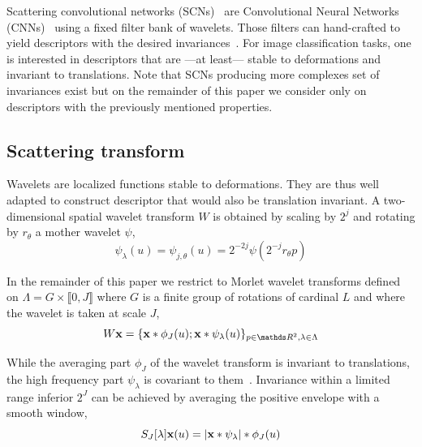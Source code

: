 \documentclass{article}
\begin{document}
		Scattering convolutional networks (SCNs)~\cite{bruna} are Convolutional Neural Networks (CNNs)~\citet{lecun1995convolutional} using a fixed filter bank of wavelets. Those filters can hand-crafted to yield descriptors with the desired invariances~\cite{work translation invariant, work rotation invariant, work rigid motion}. For image classification tasks, one is interested in descriptors that are ---at least--- stable to deformations and invariant to translations. Note that SCNs producing more complexes set of invariances exist but on the remainder of this paper we consider only on descriptors with the previously mentioned properties.
  
  \subsection{Scattering transform}
    \label{subsec:SCN/ST}
    
    Wavelets are localized functions stable to deformations. They are thus well adapted to construct descriptor that would also be translation invariant. A two-dimensional spatial wavelet transform $W$ is obtained by scaling by $2^{j}$ and rotating by $r_{\theta}$ a mother wavelet $\psi$,
    \vspace{-5pt}
    \begin{equation}
      \label{eq:multi-scale directional wavelet}
      \psi_{\lambda}(u) = \psi_{j,\theta}(u) = 2^{-2j} \psi(2^{-j}r_{\theta}p)
    \end{equation}
    
    In the remainder of this paper we restrict to Morlet wavelet transforms defined on $\Lambda = G \times \llbracket 0,J \rrbracket$ where $G$ is a finite group of rotations of cardinal $L$ and where the wavelet is taken at scale $J$,
    \vspace{-5pt}
    \begin{equation}
      \label{eq:wavelet transform}
      W\bfx = \{ \bfx \ast \phi_{J}(u); \bfx \ast \psi_{\lambda}(u) \}_{p\in\dsR^{2},\lambda \in \Lambda}
    \end{equation}
    \vspace{-15pt}

    While the averaging part $\phi_{J}$ of the wavelet transform is invariant to translations, the high frequency part $\psi_{\lambda}$ is covariant to them~\cite{mallat}. Invariance within a limited range inferior $2^{J}$ can be achieved by averaging the positive envelope with a smooth window,
    \vspace{-5pt}
    \begin{equation}
      \label{eq:Scattering transform}
      S_{J}[\lambda]{\bf x}(u) = \left| {\bf x} \ast \psi_{\lambda} \right| \ast \phi_{J}(u)
    \end{equation}
    \vspace{-10pt}
    
\end{document}
